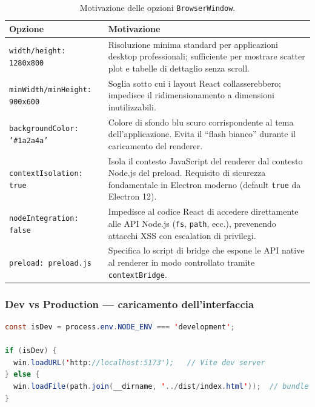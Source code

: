 \documentclass[a4paper,12pt]{article}
\begin{document}
\noindent \begin{table}[H]
\centering\small
\caption{Motivazione delle opzioni \texttt{BrowserWindow}.}
\begin{tabular}{L{4cm} L{8.5cm}}
\toprule
\textbf{Opzione} & \textbf{Motivazione} \\
\midrule
\texttt{width/height: 1280x800} &
  Risoluzione minima standard per applicazioni desktop professionali;
  sufficiente per mostrare scatter plot e tabelle di dettaglio senza scroll. \\[3pt]
\texttt{minWidth/minHeight: 900x600} &
  Soglia sotto cui i layout React collasserebbero; impedisce
  il ridimensionamento a dimensioni inutilizzabili. \\[3pt]
\texttt{backgroundColor: '\#1a2a4a'} &
  Colore di sfondo blu scuro corrispondente al tema dell'applicazione.
  Evita il ``flash bianco'' durante il caricamento del renderer. \\[3pt]
\texttt{contextIsolation: true} &
  Isola il contesto JavaScript del renderer dal contesto Node.js
  del preload. Requisito di sicurezza fondamentale in Electron
  moderno (default \texttt{true} da Electron 12). \\[3pt]
\texttt{nodeIntegration: false} &
  Impedisce al codice React di accedere direttamente alle API
  Node.js (\texttt{fs}, \texttt{path}, ecc.), prevenendo
  attacchi XSS con escalation di privilegi. \\[3pt]
\texttt{preload: preload.js} &
  Specifica lo script di bridge che espone le API native al
  renderer in modo controllato tramite \texttt{contextBridge}. \\
\bottomrule
\end{tabular}
\end{table}

\subsubsection{Dev vs Production --- caricamento dell'interfaccia}
\vspace{2pt}
\begin{lstlisting}[language=Java, caption={Caricamento condizionale dev/production.}]
const isDev = process.env.NODE_ENV === 'development';

if (isDev) {
  win.loadURL('http://localhost:5173');   // Vite dev server
} else {
  win.loadFile(path.join(__dirname, '../dist/index.html'));  // bundle
}
\end{lstlisting}
\end{document}
